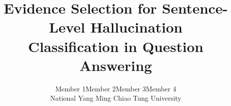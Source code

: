 \documentclass{article}
\title{Evidence Selection for Sentence-Level Hallucination\\Classification in Question Answering}
\author{Member 1\quad Member 2\quad Member 3\quad Member 4\\
National Yang Ming Chiao Tung University}
\begin{document}
\maketitle






\clearpage
{\small


}
\end{document}
